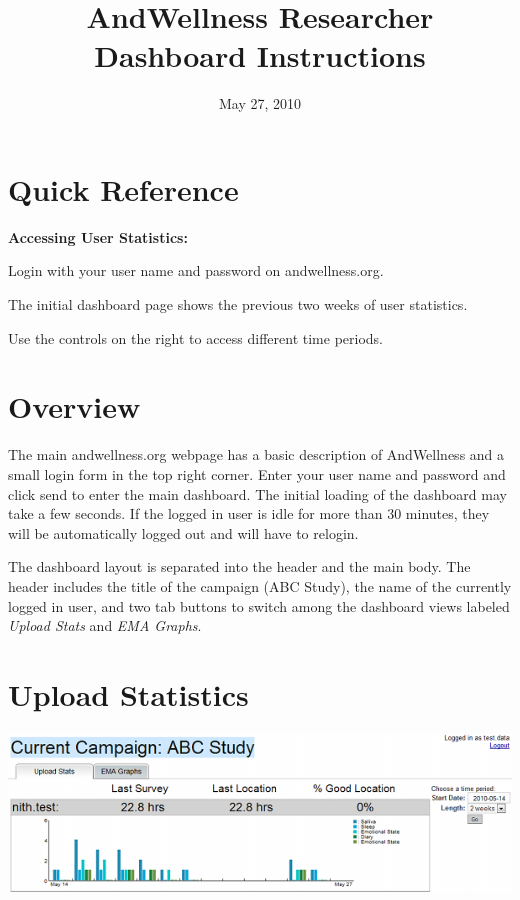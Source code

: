 \documentclass{article}
\title{AndWellness Researcher Dashboard Instructions}
\date{May 27, 2010}
\newcounter{qcounter}
\begin{document}
\maketitle

\section{Quick Reference}
\label{quick_reference}
{\bf Accessing User Statistics:}
\begin{list}{:~}{}
\item Login with your user name and password on andwellness.org.
\item The initial dashboard page shows the previous two weeks of user statistics.
\item Use the controls on the right to access different time periods.
\end{list}


\section{Overview}
\label{overview}
The main andwellness.org webpage has a basic description of AndWellness and a small
login form in the top right corner.  Enter your user name
and password and click send to enter the main dashboard.  The initial loading of the dashboard may take a few seconds.
If the logged in user is idle for more than 30 minutes, they will be automatically logged out and will have to relogin.

The dashboard layout is separated into the header and the main body.
The header includes the title of the campaign (ABC Study), the
name of the currently logged in user, and two tab buttons to switch among the
dashboard views labeled \emph{Upload Stats} and \emph{EMA Graphs}.


\section{Upload Statistics}
\label{upload_statistics}
\begin{center}
	\includegraphics[width=6in]{dashboard-shrunk}
\end{center}
\end{document}
